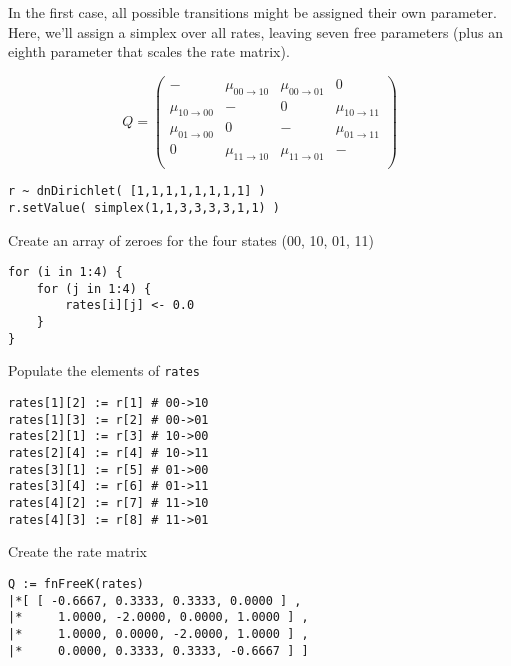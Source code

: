 In the first case, all possible transitions might be assigned their own parameter.
Here, we'll assign a simplex over all rates, leaving seven free parameters (plus an eighth parameter that scales the rate matrix).

\begin{equation*}
Q = \begin{pmatrix}
                      - & \mu_{00 \rightarrow 10} & \mu_{00 \rightarrow 01} &                       0 \\
\mu_{10 \rightarrow 00} &                       - &                       0 & \mu_{10 \rightarrow 11} \\
\mu_{01 \rightarrow 00} &                       0 &                       - & \mu_{01 \rightarrow 11} \\
                      0 & \mu_{11 \rightarrow 10} & \mu_{11 \rightarrow 01} &                       - \\
\end{pmatrix}
\end{equation*}

{\tt \begin{snugshade*}
\begin{lstlisting}
r ~ dnDirichlet( [1,1,1,1,1,1,1,1] )
r.setValue( simplex(1,1,3,3,3,3,1,1) )
\end{lstlisting}
\end{snugshade*}}

Create an array of zeroes for the four states (00, 10, 01, 11)

{\tt \begin{snugshade*}
\begin{lstlisting}
for (i in 1:4) {
    for (j in 1:4) {
        rates[i][j] <- 0.0
    }
}
\end{lstlisting}
\end{snugshade*}}

Populate the elements of {\tt rates}

{\tt \begin{snugshade*}
\begin{lstlisting}
rates[1][2] := r[1] # 00->10
rates[1][3] := r[2] # 00->01
rates[2][1] := r[3] # 10->00
rates[2][4] := r[4] # 10->11
rates[3][1] := r[5] # 01->00
rates[3][4] := r[6] # 01->11
rates[4][2] := r[7] # 11->10
rates[4][3] := r[8] # 11->01
\end{lstlisting}
\end{snugshade*}}

Create the rate matrix

{\tt \begin{snugshade*}
\begin{lstlisting}
Q := fnFreeK(rates)
|*[ [ -0.6667, 0.3333, 0.3333, 0.0000 ] ,
|*     1.0000, -2.0000, 0.0000, 1.0000 ] ,
|*     1.0000, 0.0000, -2.0000, 1.0000 ] ,
|*     0.0000, 0.3333, 0.3333, -0.6667 ] ]
\end{lstlisting}
\end{snugshade*}}

